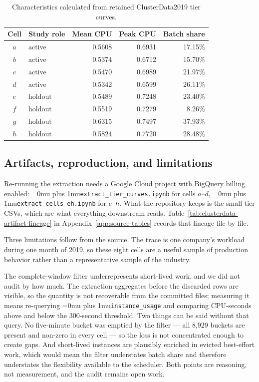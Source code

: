 ﻿\documentclass[12pt]{article}
\newcommand{\codepath}[1]{{\Urlmuskip=0mu plus 1mu\relax\nolinkurl{#1}}}
\begin{document}
\begin{table}[htbp]
  \centering
  \small
  \caption{Characteristics calculated from retained ClusterData2019 tier curves.}
  \label{tab:clusterdata-cell-summary}
  \begin{tabular}{@{}cL{0.16\textwidth}rrr@{}}
    \toprule
    Cell & Study role & Mean CPU & Peak CPU & Batch share \\
    \midrule
    \(a\) & active  & 0.5608 & 0.6931 & 17.15\% \\
    \(b\) & active  & 0.5374 & 0.6712 & 15.70\% \\
    \(c\) & active  & 0.5470 & 0.6989 & 21.97\% \\
    \(d\) & active  & 0.5342 & 0.6599 & 26.11\% \\
    \(e\) & holdout & 0.5489 & 0.7248 & 23.40\% \\
    \(f\) & holdout & 0.5519 & 0.7279 &  8.26\% \\
    \(g\) & holdout & 0.6315 & 0.7497 & 37.93\% \\
    \(h\) & holdout & 0.5824 & 0.7720 & 28.48\% \\
    \bottomrule
  \end{tabular}
\end{table}

\subsection{Artifacts, reproduction, and limitations}
\label{subsec:clusterdata-artifacts}

Re-running the extraction needs a Google Cloud project with BigQuery billing
enabled: \codepath{extract_tier_curves.ipynb} for cells \(a\)--\(d\),
\codepath{extract_cells_eh.ipynb} for \(e\)--\(h\). What the repository keeps is
the small tier CSVs, which are what everything downstream reads.
Table~\ref{tab:clusterdata-artifact-lineage} in
Appendix~\ref{app:source-tables} records that lineage file by file.

Three limitations follow from the source. The trace is one company's workload
during one month of 2019, so these eight cells are a useful sample of
production behavior rather than a representative sample of the industry.

The complete-window filter underrepresents short-lived work, and we did not
audit by how much. The extraction aggregates before the discarded rows are
visible, so the quantity is not recoverable from the committed files; measuring
it means re-querying \codepath{instance_usage} and comparing CPU-seconds above
and below the 300-second threshold. Two things can be said without that query.
No five-minute bucket was emptied by the filter --- all 8,929 buckets are
present and non-zero in every cell --- so the loss is not concentrated enough to
create gaps. And short-lived instances are plausibly enriched in evicted
best-effort work, which would mean the filter understates batch share and
therefore understates the flexibility available to the scheduler. Both points
are reasoning, not measurement, and the audit remains open work.
\end{document}
